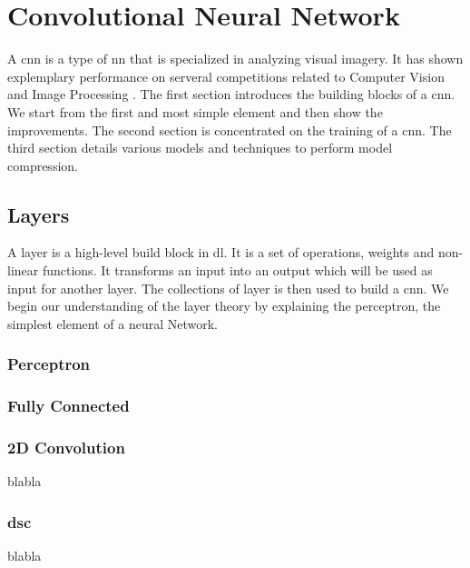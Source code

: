     \chapter{Convolutional Neural Network} \label{chap:cnn}
A \acrfull{cnn} is a type of \acrlong{nn} that is specialized in analyzing visual imagery. It has shown explemplary performance on serveral competitions related to Computer Vision and Image Processing \cite{khan_survey_2020}. \newline \newline
The first section introduces the building blocks of a \acrshort{cnn}. We start from the first and most simple element and then show the improvements. \newline \newline
The second section is concentrated on the training of a \acrshort{cnn}. \newline \newline
The third section details various models and techniques to perform model compression.
    \section{Layers}
A layer is a high-level build block in \acrshort{dl}. It is a set of operations, weights and non-linear functions. It transforms an input into an output which will be used as input for another layer. The collections of layer is then used to build a \acrlong{cnn}. We begin our understanding of the layer theory by explaining the perceptron, the simplest element of a neural Network.
    \subsection{Perceptron} \label{subs:perceptron}
    
    \subsection{Fully Connected} \label{subs:fcl}
    
\subsection{2D Convolution} \label{subs:2dconv}
blabla
\subsection{\acrlong{dsc}}  \label{subs:dsc}
blabla
